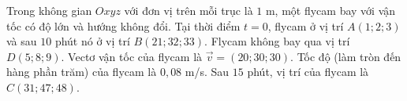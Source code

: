 \begin{ex}
Trong không gian $Oxyz$ với đơn vị trên mỗi trục là $1$ m, một flycam bay với vận tốc có độ lớn và hướng không đổi. Tại thời điểm $t=0$, flycam ở vị trí $A(1;2;3)$ và sau $10$ phút nó ở vị trí $B(21;32;33)$.
\choiceTF
{Flycam không bay qua vị trí $D(5;8;9)$.}
{Vectơ vận tốc của flycam là $\vec v=(20;30;30)$.}
{\True Tốc độ (làm tròn đến hàng phần trăm) của flycam là $0{,}08$ m/s.}
{\True Sau $15$ phút, vị trí của flycam là $C(31;47;48)$.}
\end{ex}
